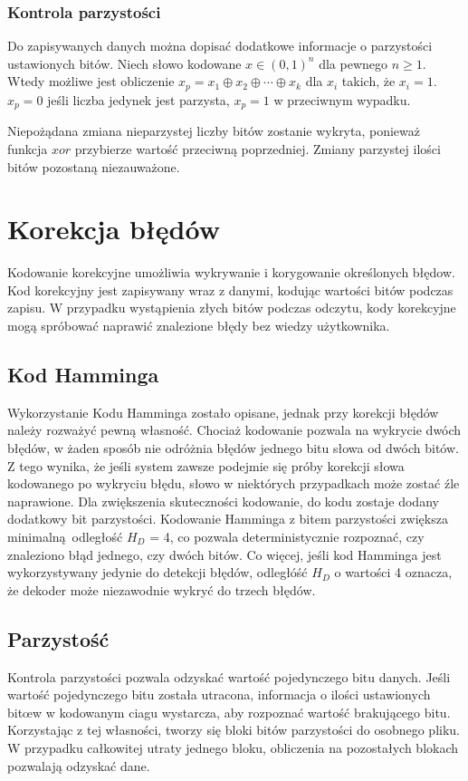 \subsubsection{Kontrola parzystości}
Do zapisywanych danych można dopisać dodatkowe informacje o parzystości ustawionych bitów. Niech słowo kodowane $x \in (0,1)^n$ dla pewnego $n \ge 1$. Wtedy możliwe jest obliczenie $x_p = x_1 \oplus x_2 \oplus \cdots \oplus x_k$ dla $x_i$ takich, że $x_i = 1$. $x_p = 0$ jeśli liczba jedynek jest parzysta, $x_p = 1$ w przeciwnym wypadku. 

Niepożądana zmiana nieparzystej liczby bitów zostanie wykryta, ponieważ funkcja $xor$ przybierze wartość przeciwną poprzedniej. Zmiany parzystej ilości bitów pozostaną niezauważone.

\section {Korekcja błędów}
Kodowanie korekcyjne umożliwia wykrywanie i korygowanie określonych błędow. Kod korekcyjny jest zapisywany wraz z danymi, kodując wartości bitów podczas zapisu. W przypadku wystąpienia złych bitów podczas odczytu, kody korekcyjne mogą spróbować naprawić znalezione błędy bez wiedzy użytkownika.
\subsection{Kod Hamminga}
Wykorzystanie Kodu Hamminga zostało opisane, jednak przy korekcji błędów należy rozważyć pewną własność. Chociaż kodowanie pozwala na wykrycie dwóch błędów, w żaden sposób nie odróżnia błędów jednego bitu słowa od dwóch bitów. Z tego wynika, że jeśli system zawsze podejmie się próby korekcji słowa kodowanego po wykryciu błędu, słowo w niektórych przypadkach może zostać źle naprawione.
Dla zwiększenia skuteczności kodowanie, do kodu zostaje dodany dodatkowy bit parzystości. Kodowanie Hamminga z bitem parzystości zwiększa minimalną odległość $H_D$ = 4, co pozwala deterministycznie rozpoznać, czy znaleziono błąd jednego, czy dwóch bitów. Co więcej, jeśli kod Hamminga jest wykorzystywany jedynie do detekcji błędów, odległóść $H_D$ o wartości 4 oznacza, że dekoder może niezawodnie wykryć do trzech błędów.  
\subsection{Parzystość}
Kontrola parzystości pozwala odzyskać wartość pojedynczego bitu danych. Jeśli wartość pojedynczego bitu została utracona, informacja o ilości ustawionych bitœw w kodowanym ciagu wystarcza, aby rozpoznać wartość brakującego bitu.
\\
Korzystając z tej własności, tworzy się bloki bitów parzystości do osobnego pliku. W przypadku całkowitej utraty jednego bloku, obliczenia na pozostałych blokach pozwalają odzyskać dane.
